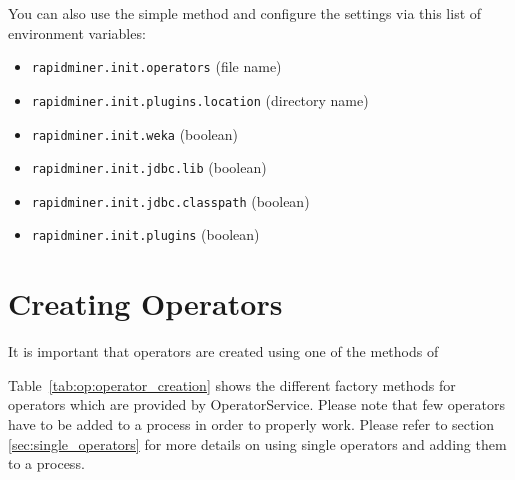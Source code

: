 You can also use the simple method  and configure the 
settings via this list of environment variables:
\begin{itemize}
\item \texttt{rapidminer.init.operators} (file name)
\item \texttt{rapidminer.init.plugins.location} (directory name)
\item \texttt{rapidminer.init.weka} (boolean)
\item \texttt{rapidminer.init.jdbc.lib} (boolean)
\item \texttt{rapidminer.init.jdbc.classpath} (boolean)
\item \texttt{rapidminer.init.plugins} (boolean)
\end{itemize}


	 
\section{Creating Operators}

It is important that operators are
created using one of the  methods of
\begin{center}
\end{center} 
Table~\ref{tab:op:operator_creation} shows the different factory methods for
operators which are provided by OperatorService. Please note that few operators
have to be added to a process in order to properly work. Please refer 
to section \ref{sec:single_operators} for more details on using single operators and 
adding them to a process.


